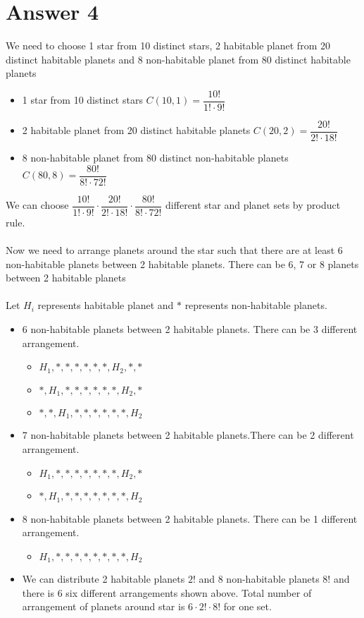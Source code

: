 \documentclass[12pt]{article}
\begin{document}
\section*{Answer 4}
We need to choose 1 star from 10 distinct stars, 2 habitable planet from 20 distinct habitable planets and 8 non-habitable planet from 80 distinct habitable planets
\begin{itemize}
    \item 1 star from 10 distinct stars $C(10,1) = \dfrac{10!}{1!\cdot9!}$
    \item 2 habitable planet from 20 distinct habitable planets $C(20,2) = \dfrac{20!}{2!\cdot18!}$
    \item 8 non-habitable planet from 80 distinct non-habitable planets $C(80,8) = \dfrac{80!}{8!\cdot72!}$
\end{itemize}
We can choose $\dfrac{10!}{1!\cdot9!} \cdot \dfrac{20!}{2!\cdot18!} \cdot \dfrac{80!}{8!\cdot72!}$ different star and planet sets by product rule. \\ \\
Now we need to arrange planets around the star such that there are at least 6 non-habitable planets between 2 habitable planets. There can be 6, 7 or 8 planets between 2 habitable planets \\\\Let $H_i$ represents habitable planet and $*$ represents non-habitable planets.
\begin{itemize}
    \item 6 non-habitable planets between 2 habitable planets. There can be 3 different arrangement.
    \begin{itemize}
        \item $H_1, *, *, *, *, *, *, H_2, *, *$
        \item $*, H_1, *, *, *, *, *, *, H_2, *$
        \item $*, *,H_1, *, *, *, *, *, *, H_2$
    \end{itemize}
    \item 7 non-habitable planets between 2 habitable planets.There can be 2 different arrangement.
    \begin{itemize}
        \item $H_1, *, *, *, *, *, *, *, H_2, *$
        \item $*, H_1, *, *, *, *, *, *, *, H_2$
    \end{itemize}
    \item 8 non-habitable planets between 2 habitable planets. There can be 1 different arrangement.
    \begin{itemize}
        \item $H_1, *, *, *, *, *, *, *, *, H_2$
    \end{itemize}
    \item We can distribute 2 habitable planets $2!$ and 8 non-habitable planets $8!$ and there is 6 six different arrangements shown above. Total number of arrangement of planets around star is $ 6\cdot2!\cdot8!$ for one set.
\end{itemize}
\end{document}
